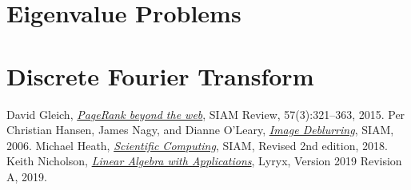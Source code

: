 \documentclass[11pt]{book}
\begin{document}

\chapter{Eigenvalue Problems} \newpage








 \newpage



\chapter{Discrete Fourier Transform} \newpage




 \newpage



\begin{thebibliography}{9}
 David Gleich, \href{https://www.cs.purdue.edu/homes/dgleich/publications.html}{{\it PageRank beyond the web}}, SIAM Review, 57(3):321–363, 2015.
 Per Christian Hansen, James Nagy, and Dianne O'Leary, \href{http://tinyurl.com/yawpzh3n}{{\it Image Deblurring}}, SIAM, 2006.
 Michael Heath, \href{http://tinyurl.com/y55hqdwn}{{\it Scientific Computing}}, SIAM, Revised 2nd edition, 2018.
 Keith Nicholson, \href{https://lyryx.com/linear-algebra-applications/}{{\it Linear Algebra with Applications}}, Lyryx, Version 2019 Revision A, 2019.
\end{thebibliography}
\end{document}
